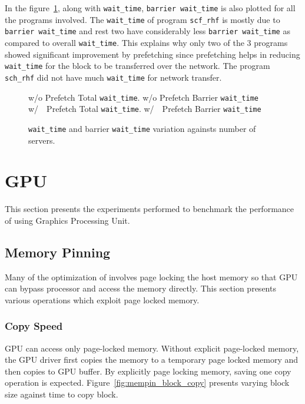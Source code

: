 In the figure~\ref{fig:prefetch_real_barrier}, along with \texttt{wait\_time},
\texttt{barrier wait\_time} is also plotted for all the programs involved. The
\texttt{wait\_time} of program \texttt{scf\_rhf} is mostly due to \texttt{barrier wait\_time}
and rest two have considerably less \texttt{barrier wait\_time} as compared to
overall \texttt{wait\_time}. This explains why only two of the 3 programs showed
significant improvement by prefetching since prefetching helps in reducing \texttt{wait\_time}
for the block to be transferred over the network. The program \texttt{sch\_rhf} did not
have much \texttt{wait\_time} for network transfer.

\begin{figure}[h]
  
   w/o Prefetch Total \texttt{wait\_time}.
   w/o Prefetch Barrier \texttt{wait\_time}
  \\
   w/~~Prefetch Total \texttt{wait\_time}.
    w/~~Prefetch Barrier \texttt{wait\_time}
  \caption{\texttt{wait\_time} and barrier \texttt{wait\_time} variation againsts number of servers.}
  \label{fig:prefetch_real_barrier}
\end{figure}
\section{GPU}
This section presents the experiments performed to benchmark the performance of
using Graphics Processing Unit.
\subsection{Memory Pinning}
Many of the optimization of involves page locking the host memory so that GPU can
bypass processor and access the memory directly. This section presents various
operations which exploit page locked memory.
\subsubsection{Copy Speed}
GPU can access only page-locked memory. Without explicit page-locked memory, the
GPU driver first copies the memory to a temporary page locked memory and then copies
to GPU buffer. By explicitly page locking memory, saving one copy operation is expected.
Figure~\ref{fig:mempin_block_copy} presents varying block size against time to
copy block.

